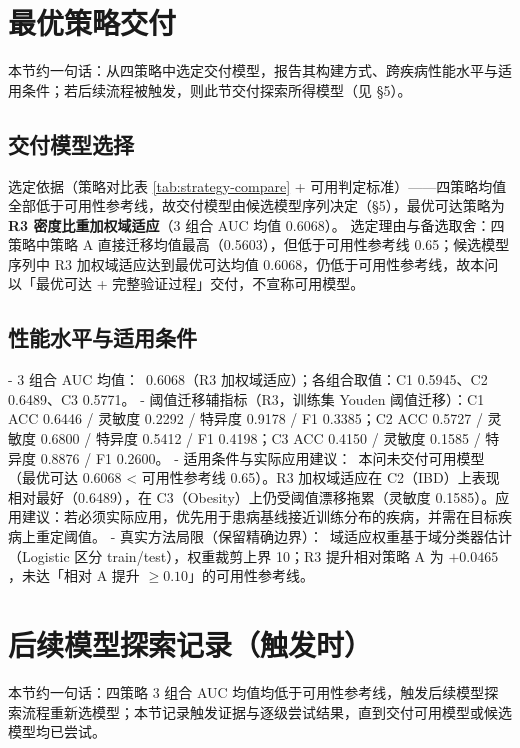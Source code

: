 \documentclass{internal-report}
\begin{document}

\section{最优策略交付}

本节约一句话：从四策略中选定交付模型，报告其构建方式、跨疾病性能水平与适用条件；若后续流程被触发，则此节交付探索所得模型（见 §5）。

\subsection{交付模型选择}
选定依据（策略对比表 \ref{tab:strategy-compare} + 可用判定标准）——四策略均值全部低于可用性参考线，故交付模型由候选模型序列决定（§5），最优可达策略为 \textbf{R3 密度比重加权域适应}（3 组合 AUC 均值 0.6068）。
选定理由与备选取舍：四策略中策略 A 直接迁移均值最高（0.5603），但低于可用性参考线 0.65；候选模型序列中 R3 加权域适应达到最优可达均值 0.6068，仍低于可用性参考线，故本问以「最优可达 + 完整验证过程」交付，不宣称可用模型。

\subsection{性能水平与适用条件}
- 3 组合 AUC 均值：\ 0.6068（R3 加权域适应）；各组合取值：C1 0.5945、C2 0.6489、C3 0.5771。
- 阈值迁移辅指标（R3，训练集 Youden 阈值迁移）：C1 ACC 0.6446 / 灵敏度 0.2292 / 特异度 0.9178 / F1 0.3385；C2 ACC 0.5727 / 灵敏度 0.6800 / 特异度 0.5412 / F1 0.4198；C3 ACC 0.4150 / 灵敏度 0.1585 / 特异度 0.8876 / F1 0.2600。
- 适用条件与实际应用建议：\ 本问未交付可用模型（最优可达 0.6068 < 可用性参考线 0.65）。R3 加权域适应在 C2（IBD）上表现相对最好（0.6489），在 C3（Obesity）上仍受阈值漂移拖累（灵敏度 0.1585）。应用建议：若必须实际应用，优先用于患病基线接近训练分布的疾病，并需在目标疾病上重定阈值。
- 真实方法局限（保留精确边界）：\ 域适应权重基于域分类器估计（Logistic 区分 train/test），权重裁剪上界 10；R3 提升相对策略 A 为 $+0.0465$，未达「相对 A 提升 $\ge 0.10$」的可用性参考线。


\section{后续模型探索记录（触发时）}

本节约一句话：四策略 3 组合 AUC 均值均低于可用性参考线，触发后续模型探索流程重新选模型；本节记录触发证据与逐级尝试结果，直到交付可用模型或候选模型均已尝试。
\end{document}
